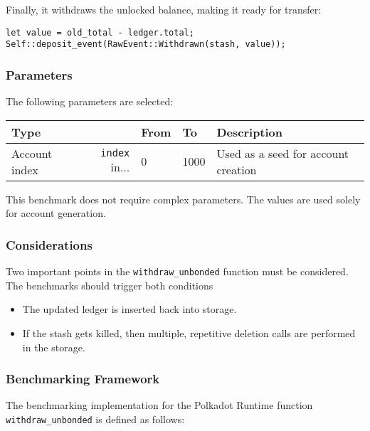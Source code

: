 \documentclass[11pt,a4paper]{article}
\begin{document}
Finally, it withdraws the unlocked balance, making it ready for transfer:

\begin{verbatim}
let value = old_total - ledger.total;
Self::deposit_event(RawEvent::Withdrawn(stash, value));
\end{verbatim}

\subsubsection*{Parameters}
The following parameters are selected:

\begin{center}
  \begin{tabular}{ l|r l l l }
    \textbf{Type} && \textbf{From} & \textbf{To} & \textbf{Description}\\
    \hline
    Account index & \verb|index| in... & 0 & 1000 & Used as a seed for account
    creation \\
  \end{tabular}
\end{center}

This benchmark does not require complex parameters. The values are used solely
for account generation.

\subsubsection{Considerations}

Two important points in the \verb|withdraw_unbonded| function must be considered.
The benchmarks should trigger both conditions

\begin{itemize}
  \item The updated ledger is inserted back into storage.
  \item If the stash gets killed, then multiple, repetitive deletion calls are
  performed in the storage.
\end{itemize}

\subsubsection{Benchmarking Framework}

The benchmarking implementation for the Polkadot Runtime function
\verb|withdraw_unbonded| is defined as follows:
\newline
\end{document}
